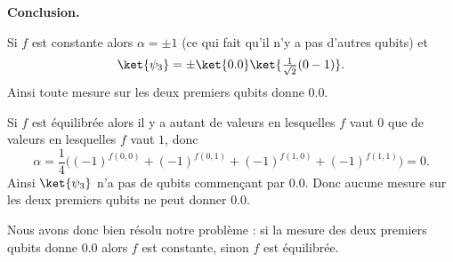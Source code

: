 \documentclass[11pt,class=report,crop=false]{standalone}
\begin{document}
\textbf{Conclusion.}

Si $f$ est constante alors $\alpha = \pm 1$ (ce qui fait qu'il n'y a pas d'autres qubits)
et 
$$\ket{\psi_3} = \pm\ket{0.0}\ket{\tfrac1{\sqrt2}(0-1)}.$$
Ainsi toute mesure sur les deux premiers qubits donne $0.0$.

Si $f$ est équilibrée alors il y a autant de valeurs en lesquelles $f$ vaut $0$ que de valeurs en lesquelles $f$ vaut $1$, donc 
$$\alpha = \frac14\big(
(-1)^{f(0,0)} + (-1)^{f(0,1)} + (-1)^{f(1,0)} + (-1)^{f(1,1)}\big) = 0.$$
Ainsi $\ket{\psi_3}$ n'a pas de qubits commençant par $0.0$.
Donc aucune mesure sur les deux premiers qubits ne peut donner $0.0$.

Nous avons donc bien résolu notre problème : si la mesure des deux premiers qubits donne $0.0$ alors $f$ est constante, sinon $f$ est équilibrée.
\end{document}
